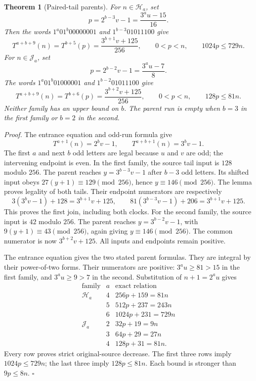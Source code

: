 \documentclass[11pt,letterpaper]{article}
\newtheorem{theorem}{Theorem}
\newenvironment{proof}{\noindent\textit{Proof.}}{\hfill\(\square\)}
\begin{document}
\begin{theorem}[Paired-tail parents]
For \(n\in\mathcal H_a\), set
\[
p=2^{b-3}v-1=\frac{3^a u-15}{16}.
\]
Then the words \(1^a01^b00000001\) and \(1^{b-3}01011100\) give
\[
T^{a+b+9}(n)=T^{b+5}(p)=\frac{3^{b+1}v+125}{256},\qquad
0<p<n,\qquad1024p\le729n.
\]
For \(n\in\mathcal J_a\), set
\[
p=2^{b-2}v-1=\frac{3^a u-7}{8}.
\]
The words \(1^a01^b01000001\) and \(1^{b-2}01011100\) give
\[
T^{a+b+9}(n)=T^{b+6}(p)=\frac{3^{b+2}v+125}{256},\qquad
0<p<n,\qquad128p\le81n.
\]
Neither family has an upper bound on \(b\). The parent run is empty
when \(b=3\) in the first family or \(b=2\) in the second.
\end{theorem}
\begin{proof}
The entrance equation and odd-run formula give
\[
T^{a+1}(n)=2^b v-1,\qquad T^{a+b+1}(n)=3^b v-1.
\]
The first \(a\) and next \(b\) odd letters are legal because \(u\)
and \(v\) are odd; the intervening endpoint is even. In the first
family, the source tail input is \(128\) modulo \(256\).
The parent reaches \(y=3^{b-3}v-1\) after \(b-3\) odd letters.
Its shifted input obeys
\(27(y+1)\equiv129\pmod{256}\), hence
\(y\equiv146\pmod{256}\). The lemma proves legality of both tails.
Their endpoint numerators are respectively
\[
3(3^b v-1)+128=3^{b+1}v+125,
\qquad81(3^{b-3}v-1)+206=3^{b+1}v+125.
\]
This proves the first join, including both clocks.
For the second family, the source input is \(42\) modulo \(256\).
The parent reaches \(y=3^{b-2}v-1\), with
\(9(y+1)\equiv43\pmod{256}\), again giving
\(y\equiv146\pmod{256}\). The common numerator is now
\(3^{b+2}v+125\). All inputs and endpoints remain positive.

The entrance equation gives the two stated parent formulas. They are
integral by their power-of-two forms. Their numerators are positive:
\(3^a u\ge81>15\) in the first family, and
\(3^a u\ge9>7\) in the second. Substitution of \(n+1=2^a u\) gives
\[
\begin{array}{c|c|c}
\text{family}&a&\text{exact relation}\\
\hline
\mathcal H_a&4&256p+159=81n\\
&5&512p+237=243n\\
&6&1024p+231=729n\\
\hline
\mathcal J_a&2&32p+19=9n\\
&3&64p+29=27n\\
&4&128p+31=81n.
\end{array}
\]
Every row proves strict original-source decrease. The first three rows
imply \(1024p\le729n\); the last three imply \(128p\le81n\).
Each bound is stronger than \(9p\le8n\).
\end{proof}
\end{document}
